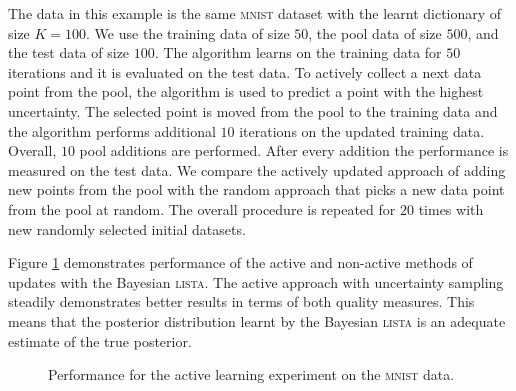 \documentclass{article}
\begin{document}
The data in this example is the same \textsc{mnist} dataset with the learnt dictionary of size $K=100$. We use the training data of size $50$, the pool data of size $500$,  and the test data of size $100$. The algorithm learns on the training data for $50$ iterations and it is evaluated on the test data. To actively collect a next data point from the pool, the algorithm is used to predict a point with the highest uncertainty. The selected point is moved from the pool to the training data and the algorithm performs additional $10$ iterations on the updated training data. Overall, $10$ pool additions are performed. After every addition the performance is measured on the test data. We compare the actively updated approach of adding new points from the pool with the random approach that picks a new data point from the pool at random. The overall procedure is repeated for $20$ times with new randomly selected initial datasets.

Figure \ref{fig:active_learning_mnist} demonstrates performance of the active and non-active methods of updates with the Bayesian \textsc{lista}. The active approach with uncertainty sampling steadily demonstrates better results in terms of both quality measures. This means that the posterior distribution learnt by the Bayesian \textsc{lista} is an adequate estimate of the true posterior.
\begin{figure}[t]
\centering
{}%
\caption{Performance for the active learning experiment on the \textsc{mnist} data. }
\label{fig:active_learning_mnist}
\end{figure}
\end{document}
